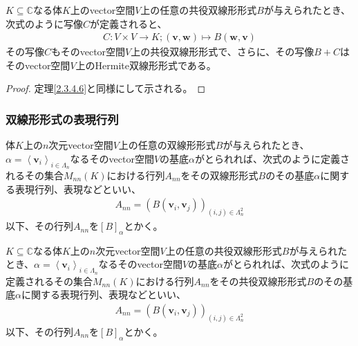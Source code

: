 \documentclass[dvipdfmx]{jsarticle}
\begin{document}
\begin{thm}\label{2.3.4.7}
$K \subseteq \mathbb{C}$なる体$K$上のvector空間$V$上の任意の共役双線形形式$B$が与えられたとき、次式のように写像$C$が定義されると、
\begin{align*}
C:V \times V \rightarrow K;\left( \mathbf{v},\mathbf{w} \right) \mapsto B\left( \mathbf{w},\mathbf{v} \right)
\end{align*}
その写像$C$もそのvector空間$V$上の共役双線形形式で、さらに、その写像$B + C$はそのvector空間$V$上のHermite双線形形式である。
\end{thm}
\begin{proof} 定理\ref{2.3.4.6}と同様にして示される。
\end{proof}
\subsubsection{双線形形式の表現行列}%
\begin{dfn}
体$K$上の$n$次元vector空間$V$上の任意の双線形形式$B$が与えられたとき、$\alpha = \left\langle \mathbf{v}_{i} \right\rangle_{i \in \varLambda_{n}}$なるそのvector空間$V$の基底$\alpha$がとられれば、次式のように定義されるその集合$M_{nn}(K)$における行列$A_{nn}$をその双線形形式$B$のその基底$\alpha$に関する表現行列、表現などといい、
\begin{align*}
A_{nn} = \left( B\left( \mathbf{v}_{i},\mathbf{v}_{j} \right) \right)_{(i,j) \in \varLambda_{n}^{2}}
\end{align*}
以下、その行列$A_{nn}$を$[ B]_{\alpha}$とかく。
\end{dfn}
\begin{dfn}
$K \subseteq \mathbb{C}$なる体$K$上の$n$次元vector空間$V$上の任意の共役双線形形式$B$が与えられたとき、$\alpha = \left\langle \mathbf{v}_{i} \right\rangle_{i \in \varLambda_{n}}$なるそのvector空間$V$の基底$\alpha$がとられれば、次式のように定義されるその集合$M_{nn}(K)$における行列$A_{nn}$をその共役双線形形式$B$のその基底$\alpha$に関する表現行列、表現などといい、
\begin{align*}
A_{nn} = \left( B\left( \mathbf{v}_{i},\mathbf{v}_{j} \right) \right)_{(i,j) \in \varLambda_{n}^{2}}
\end{align*}
以下、その行列$A_{nn}$を$[ B]_{\alpha}$とかく。
\end{dfn}
\end{document}
